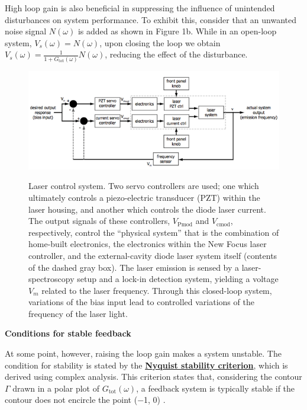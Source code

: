 \documentclass{../lab}
\begin{document}
High loop gain is also beneficial in suppressing the influence of unintended disturbances on system performance. To exhibit this, consider that an unwanted noise signal $N(\omega)$ is added as shown in Figure 1b. While in an open-loop system, $V_s(\omega) = N(\omega)$, upon closing the loop we obtain $V_s(\omega) =\frac{1}{1+G_\text{tot}(\omega)} N(\omega)$, reducing the effect of the disturbance.

\begin{figure}[h]
    \centering
    \href{http://experimentationlab.berkeley.edu/sites/default/files/images/600px-MOTimage002.png}{\includegraphics[width=0.9\linewidth]{images/600px-MOTimage002.png}}
    \caption{Laser control system. Two servo controllers are used; one which ultimately controls a piezo-electric transducer (PZT) within the laser housing, and another which controls the diode laser current. The output signals of these controllers, $V_\text{Pmod}$ and $V_\text{cmod}$, respectively, control the ``physical system'' that is the combination of home-built electronics, the electronics within the New Focus laser controller, and the external-cavity diode laser system itself (contents of the dashed gray box). The laser emission is sensed by a laser-spectroscopy setup and a lock-in detection system, yielding a voltage $V_m$ related to the laser frequency. Through this closed-loop system, variations of the bias input lead to controlled variations of the frequency of the laser light.}
    \label{fig:LaserControlSystem}
\end{figure}

\textbf{Conditions for stable feedback}

At some point, however, raising the loop gain makes a system unstable. The condition for stability is stated by the \href{http://en.wikipedia.org/wiki/Nyquist\_stability\_criterion}{\textbf{Nyquist stability criterion}}, which is derived using complex analysis. This criterion states that, considering the contour $\Gamma$ drawn in a polar plot of $G_\text{tot}(\omega)$, a feedback system is typically stable if the contour does not encircle the point ($-$1, 0) \cite{PreciseCriterion}.
\end{document}
